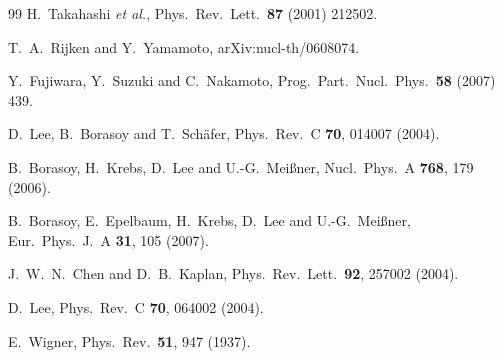 \documentclass[aps,rmp,nofootinbib,twocolumn,floatfix]{revtex4}
\begin{document}
\begin{thebibliography}{99}
  H.~Takahashi {\it et al.},
  Phys.\ Rev.\ Lett.\  {\bf 87} (2001) 212502.

  T.~A.~Rijken and Y.~Yamamoto,
  arXiv:nucl-th/0608074.

  Y.~Fujiwara, Y.~Suzuki and C.~Nakamoto,
  Prog.\ Part.\ Nucl.\ Phys.\  {\bf 58} (2007) 439.


  D.~Lee, B.~Borasoy and T.~Sch\"afer,
  Phys.\ Rev.\  C {\bf 70}, 014007 (2004).

  B.~Borasoy, H.~Krebs, D.~Lee and U.-G.~Mei{\ss}ner,
  Nucl.\ Phys.\  A {\bf 768}, 179 (2006).

  B.~Borasoy, E.~Epelbaum, H.~Krebs, D.~Lee and U.-G.~Mei\ss ner,
  Eur.\ Phys.\ J.\  A {\bf 31}, 105 (2007).

  J.~W.~N.~Chen and D.~B.~Kaplan,
  Phys.\ Rev.\ Lett.\  {\bf 92}, 257002 (2004).

  D.~Lee,
  Phys.\ Rev.\  C {\bf 70}, 064002 (2004).

  E.~Wigner,
  Phys.\ Rev.\  {\bf 51}, 947 (1937).


\end{thebibliography}
\end{document}
